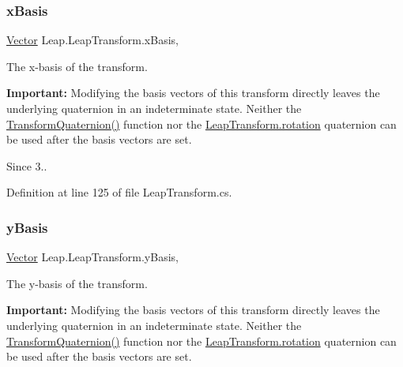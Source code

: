 \subsubsection{\texorpdfstring{xBasis}{xBasis}}
{\footnotesize\ttfamily \mbox{\hyperlink{struct_leap_1_1_vector}{Vector}} Leap.\+Leap\+Transform.\+x\+Basis\hspace{0.3cm}{\ttfamily [get]}, {\ttfamily [set]}}



The x-\/basis of the transform. 

{\bfseries{Important\+:}} Modifying the basis vectors of this transform directly leaves the underlying quaternion in an indeterminate state. Neither the \mbox{\hyperlink{struct_leap_1_1_leap_transform_ad9658850a91beef88214dcaac6f6e6af}{Transform\+Quaternion()}} function nor the \mbox{\hyperlink{struct_leap_1_1_leap_transform_a69917840386ec2421d3886be4ec7833a}{Leap\+Transform.\+rotation}} quaternion can be used after the basis vectors are set.

\begin{DoxySince}{Since}
3.. 
\end{DoxySince}


Definition at line 125 of file Leap\+Transform.\+cs.

\mbox{\label{struct_leap_1_1_leap_transform_ac46874ef78036f1bc2d2bf76dd9a62a2}} 
\subsubsection{\texorpdfstring{yBasis}{yBasis}}
{\footnotesize\ttfamily \mbox{\hyperlink{struct_leap_1_1_vector}{Vector}} Leap.\+Leap\+Transform.\+y\+Basis\hspace{0.3cm}{\ttfamily [get]}, {\ttfamily [set]}}



The y-\/basis of the transform. 

{\bfseries{Important\+:}} Modifying the basis vectors of this transform directly leaves the underlying quaternion in an indeterminate state. Neither the \mbox{\hyperlink{struct_leap_1_1_leap_transform_ad9658850a91beef88214dcaac6f6e6af}{Transform\+Quaternion()}} function nor the \mbox{\hyperlink{struct_leap_1_1_leap_transform_a69917840386ec2421d3886be4ec7833a}{Leap\+Transform.\+rotation}} quaternion can be used after the basis vectors are set.

